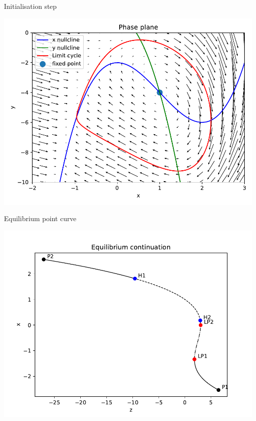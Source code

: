 \documentclass[presentation]{beamer}
\begin{document}
\begin{frame}[label={sec:orgcd2ab6c}]{Initialisation step}
\begin{center}
\includegraphics[height=.9\textheight]{./phaseplane.pdf}
\end{center}
\end{frame}
\begin{frame}[label={sec:orge46931d}]{Equilibrium point curve}
\begin{center}
\includegraphics[height=.9\textheight]{./epc-1.pdf}
\end{center}
\end{frame}
\end{document}
